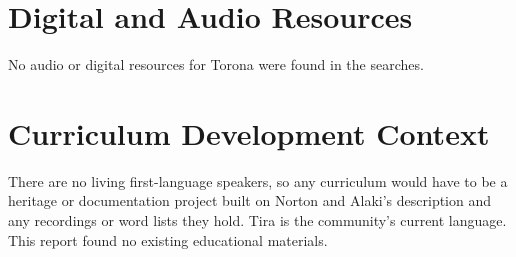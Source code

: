 \documentclass[12pt]{article}
\begin{document}
\section{Digital and Audio Resources}
No audio or digital resources for Torona were found in the searches.

\section{Curriculum Development Context}
There are no living first-language speakers, so any curriculum would have to be a heritage or documentation project built on Norton and Alaki's description and any recordings or word lists they hold. Tira is the community's current language. This report found no existing educational materials.
\end{document}
